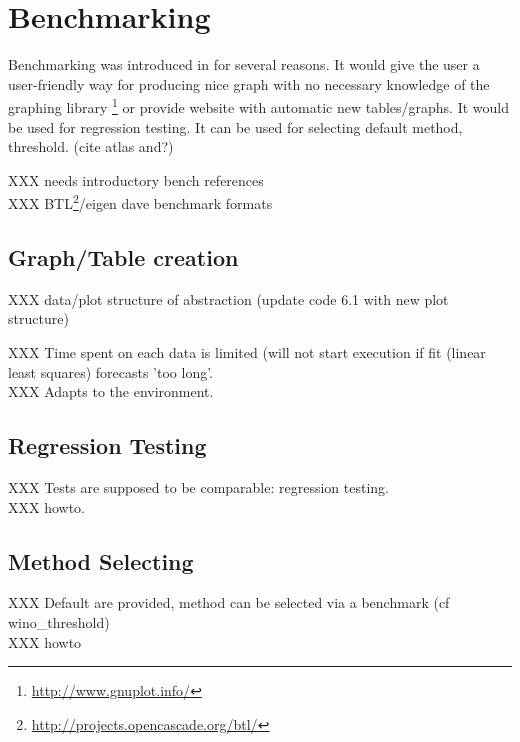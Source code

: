 \section{Benchmarking}\label{sec:bench}
%
Benchmarking was introduced in \linbox for several reasons. It would give the
user a user-friendly way for producing nice graph with no necessary knowledge
of the graphing library \gnuplot%
%
%
\footnote{\url{http://www.gnuplot.info/}}
%
or provide \linbox website with automatic new tables/graphs.
It would be used for regression testing.
It can be used for selecting default method, threshold. (cite atlas and?)
\par
%
XXX needs introductory bench references\\
XXX BTL\footnote{\url{http://projects.opencascade.org/btl/}}/eigen
%
\danger dave benchmark formats
%
\subsection{Graph/Table creation}
%
XXX data/plot structure of abstraction (update code 6.1 with new plot structure)
%
\par
%
% 
%
XXX Time spent on each data is limited (will not start execution if fit (linear least squares) forecasts 'too long'.\\
XXX Adapts to the environment.
%
\subsection{Regression Testing}
%
XXX Tests are supposed to be comparable: regression testing.\\
XXX howto.
%
\subsection{Method Selecting}
%
XXX Default are provided, method can be selected via a benchmark (cf wino\_threshold)\\
XXX howto
